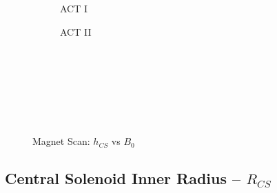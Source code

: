 \begin{figure*}[h!]
\begin{subfigure}[t]{0.45\textwidth}
\begin{adjustbox}{width=\textwidth}
      \Large
      
    \end{adjustbox}
        \caption{ACT I}
    \end{subfigure}
    \hfill
    \begin{subfigure}[t]{0.45\textwidth}
        \centering
    \begin{adjustbox}{width=\textwidth}
      \Large
      
    \end{adjustbox}
        \caption{ACT II}
    \end{subfigure}
    \hfill \hfill ~\\ ~\\ ~\\ ~\\
  \caption[]{Magnet Scan: $h_{CS}$ vs $B_0$} ~\\
\end{figure*}


\clearpage

\newpage

\subsection*{Central Solenoid Inner Radius -- $R_{CS}$}
  \label{subsection:scan_R_CS}

